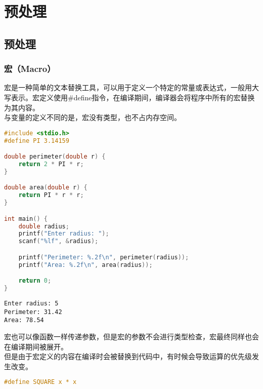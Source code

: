 \chapter{预处理}

\section{预处理}

\subsection{宏（Macro）}

宏是一种简单的文本替换工具，可以用于定义一个特定的常量或表达式，一般用大写表示。宏定义使用\#define指令，在编译期间，编译器会将程序中所有的宏替换为其内容。\\

与变量的定义不同的是，宏没有类型，也不占内存空间。\\


\begin{lstlisting}[language=C]
#include <stdio.h>
#define PI 3.14159

double perimeter(double r) {
    return 2 * PI * r;
}

double area(double r) {
    return PI * r * r;
}

int main() {
    double radius;
    printf("Enter radius: ");
    scanf("%lf", &radius);

    printf("Perimeter: %.2f\n", perimeter(radius));
    printf("Area: %.2f\n", area(radius));

    return 0;
}
\end{lstlisting}

\begin{tcolorbox}
    \begin{verbatim}
Enter radius: 5
Perimeter: 31.42
Area: 78.54
	\end{verbatim}
\end{tcolorbox}

宏也可以像函数一样传递参数，但是宏的参数不会进行类型检查，宏最终同样也会在编译期间被展开。\\

但是由于宏定义的内容在编译时会被替换到代码中，有时候会导致运算的优先级发生改变。

\vspace{-0.5cm}

\begin{lstlisting}[language=C]
#define SQUARE x * x
\end{lstlisting}

